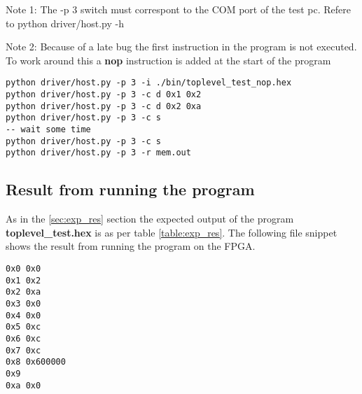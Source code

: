 Note 1: The -p 3 switch must correspont to the COM port of the test pc. Refere to python driver/host.py -h

Note 2: Because of a late bug the first instruction in the program is not executed. To work around this a {\bf nop} instruction 
is added at the start of the program

\begin{verbatim}
python driver/host.py -p 3 -i ./bin/toplevel_test_nop.hex
python driver/host.py -p 3 -c d 0x1 0x2
python driver/host.py -p 3 -c d 0x2 0xa
python driver/host.py -p 3 -c s
-- wait some time
python driver/host.py -p 3 -c s
python driver/host.py -p 3 -r mem.out
\end{verbatim}

\subsection{Result from running the program}
As in the \ref{sec:exp_res} section the expected output of the program {\bf toplevel\_test.hex} is as per table \ref{table:exp_res}.
The following file snippet shows the result from running the program on the FPGA.

\begin{verbatim}
0x0 0x0
0x1 0x2
0x2 0xa
0x3 0x0
0x4 0x0
0x5 0xc
0x6 0xc
0x7 0xc
0x8 0x600000
0x9
0xa	0x0
\end{verbatim}

